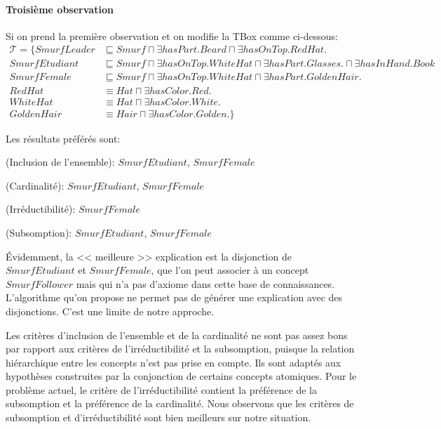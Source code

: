 \documentclass{article}
\begin{document}
\paragraph*{Troisième observation}
Si on prend la première observation et on modifie la TBox comme ci-dessous:\vspace{-0.3cm}
\begin{align*}
\mathcal{T}=\{ SmurfLeader &\sqsubseteq Smurf \sqcap \exists hasPart.Beard \sqcap \exists hasOnTop.RedHat. \\
SmurfEtudiant &\sqsubseteq Smurf \sqcap \exists hasOnTop.WhiteHat \sqcap \exists hasPart.Glasses. \sqcap \exists hasInHand.Book \\
SmurfFemale &\sqsubseteq Smurf \sqcap \exists hasOnTop.WhiteHat \sqcap \exists hasPart.GoldenHair. \\
RedHat &\equiv Hat \sqcap \exists hasColor.Red. \\
WhiteHat &\equiv Hat \sqcap \exists hasColor.White. \\
GoldenHair &\equiv Hair \sqcap \exists hasColor.Golden.\}
\end{align*}

Les résultats préférés sont:

(Inclusion de l'ensemble): $SmurfEtudiant$, $SmurfFemale$

(Cardinalité): $SmurfEtudiant$, $SmurfFemale$
 
(Irréductibilité): $SmurfFemale$

(Subsomption): $SmurfEtudiant$, $SmurfFemale$

Évidemment, la << meilleure >> explication est la disjonction de $SmurfEtudiant$ et $SmurfFemale$, que l'on peut associer à un concept $SmurfFollower$ mais qui n'a pas d'axiome dans
cette base de connaissances. L'algorithme qu'on propose ne permet pas de générer une explication avec des disjonctions. C'est une limite de notre approche. 

Les critères d'inclusion de l'ensemble et de la cardinalité ne sont pas assez bons par rapport aux critères de l'irréductibilité et la subsomption, puisque la relation hiérarchique entre les concepts
 n'est pas prise en compte. Ils sont adaptés aux hypothèses construites par la conjonction de certains concepts atomiques.
Pour le problème actuel, le critère de l'irréductibilité contient la préférence de la subsomption et la préférence de la cardinalité. 
Nous observons que les critères de subsomption et d'irréductibilité sont bien meilleurs sur notre situation.
\end{document}
